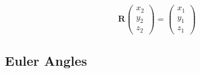 \documentclass[compress]{beamer}
\begin{document}
\begin{frame}[fragile]
  \begin{equation*}
    \mathbf R
    \left(
      \begin{matrix}
        x_{2}\\
        y_{2}\\
        z_{2}
      \end{matrix}\right)
    = \left(
      \begin{matrix}
        x_{1}\\
        y_{1}\\
        z_{1}
      \end{matrix}\right)
  \end{equation*}

\end{frame}

\subsection*{Euler Angles}
\label{sec:euler-angles}
\end{document}

